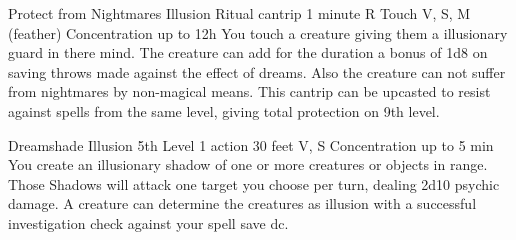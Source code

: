 \documentclass[a4paper,10pt,twoside,twocolumn]{dndbook} %
\begin{document}
	\DndSpellHeader%
	{Protect from Nightmares}
	{Illusion Ritual cantrip}
	{1 minute R}
	{Touch}
	{V, S, M (feather)}
	{Concentration up to 12h}
	You touch a creature giving them a illusionary guard in there mind. The creature can add for the duration a bonus of 1d8 on saving throws made against the effect of dreams. Also the creature can not suffer from nightmares by non-magical means.\linebreak\linebreak
	This cantrip can be upcasted to resist against spells from the same level, giving total protection on 9th level.
	
	\DndSpellHeader%
	{Dreamshade}
	{Illusion 5th Level}
	{1 action}
	{30 feet}
	{V, S}
	{Concentration up to 5 min}
	You create an illusionary shadow of one or more creatures or objects in range. Those Shadows will attack one target you choose per turn, dealing 2d10 psychic damage. A creature can determine the creatures as illusion with a successful investigation check against your spell save dc.
\end{document}
